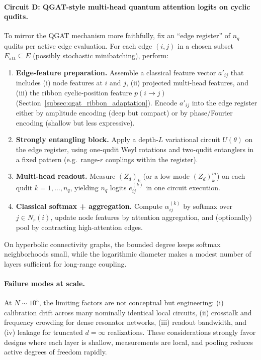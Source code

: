 \documentclass[11pt,oneside]{amsbook}
\numberwithin{equation}{section}
\theoremstyle{plain}
\theoremstyle{definition}
\theoremstyle{remark}
\begin{document}
\paragraph{Circuit D: QGAT-style multi-head quantum attention logits on cyclic qudits.}
To mirror the QGAT mechanism \cite{Ning2025QGAT} more faithfully, fix an ``edge register'' of $n_q$ qudits per active edge evaluation.
For each edge $(i,j)$ in a chosen subset $E_{\mathrm{att}}\subseteq E$ (possibly stochastic minibatching), perform:
\begin{enumerate}
\item \textbf{Edge-feature preparation.} Assemble a classical feature vector $a'_{ij}$ that includes (i) node features at $i$ and $j$,
(ii) projected multi-head features, and (iii) the ribbon cyclic-position feature $p(i\to j)$ (Section~\ref{subsec:qgat_ribbon_adaptation}).
Encode $a'_{ij}$ into the edge register either by amplitude encoding (deep but compact) or by phase/Fourier encoding (shallow but less expressive).
\item \textbf{Strongly entangling block.} Apply a depth-$L$ variational circuit $U(\theta)$ on the edge register, using one-qudit Weyl rotations and
two-qudit entanglers in a fixed pattern (e.g.\ range-$r$ couplings within the register).
\item \textbf{Multi-head readout.} Measure $(Z_d)_k$ (or a low mode $(Z_d)_k^m$) on each qudit $k=1,\dots,n_q$, yielding $n_q$ logits
$e^{(k)}_{ij}$ in one circuit execution.
\item \textbf{Classical softmax + aggregation.} Compute $\alpha^{(k)}_{ij}$ by softmax over $j\in N_r(i)$, update node features by attention aggregation,
and (optionally) pool by contracting high-attention edges.
\end{enumerate}
On hyperbolic connectivity graphs, the bounded degree keeps softmax neighborhoods small, while the logarithmic diameter makes a modest number of
layers sufficient for long-range coupling.


\paragraph{Failure modes at scale.}
At $N\sim 10^5$, the limiting factors are not conceptual but engineering:
(i) calibration drift across many nominally identical local circuits, (ii) crosstalk and frequency crowding for
dense resonator networks, (iii) readout bandwidth, and (iv) leakage for truncated $d=\infty$ realizations.
These considerations strongly favor designs where each layer is shallow, measurements are local, and pooling
reduces active degrees of freedom rapidly.
\end{document}
